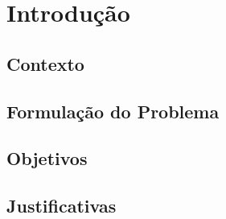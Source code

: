 \chapter[Introdução]{Introdução}

\section{Contexto}
\section{Formulação do Problema}
\section{Objetivos}
\section{Justificativas}


